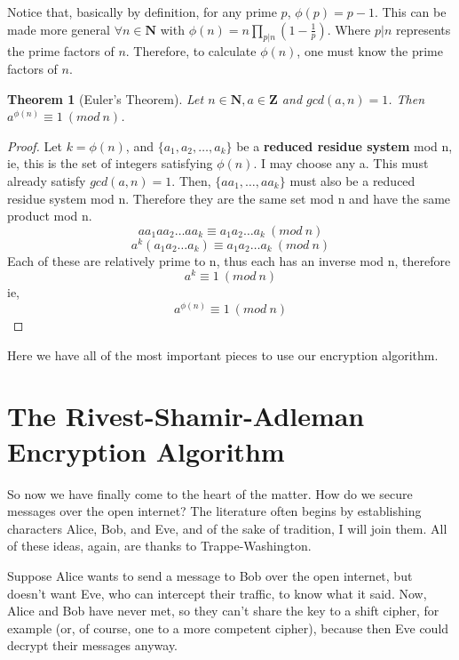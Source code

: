 \documentclass{article}
\newtheorem{thrm}{\textbf{Theorem}}
\begin{document}
                Notice that, basically by definition, for any prime $p$, $\phi(p)=p-1$.  
                This can be made more general $\forall n \in\mathbf{N}$ with  $\phi(n)=n\prod_{p|n}(1-\frac{1}{p})$.  
                Where $p|n$ represents the prime factors of $n$.
                Therefore, to calculate $\phi(n)$, one must know the prime factors of $n$. 
                
                \begin{thrm}[Euler's Theorem] Let $n\in\mathbf{N},a\in\mathbf{Z}$ and $gcd(a,n)=1$.  Then $a^{\phi(n)}\equiv 1\ (mod\ n)$.
                \end{thrm}
                
                \begin{proof}
	                Let $k=\phi(n)$, and $\{a_1,a_2,\ldots,a_k\} $ be a \textbf{reduced residue system} mod n, ie, this is the set of integers satisfying $\phi(n)$.  I may choose any a.  This must already satisfy $gcd(a,n)=1$.  Then, $\{aa_1,\ldots,aa_k\}$ must also be a reduced residue system mod n.  
	                Therefore they are the same set mod n and have the same product mod n.
	                $$ aa_1aa_2\ldots aa_k\equiv a_1a_2\ldots a_k\ (mod\ n)$$
	                $$ a^k(a_1a_2\ldots a_k)\equiv a_1a_2\ldots a_k\ (mod\ n) $$
	                Each of these are relatively prime to n, thus each has an inverse mod n, therefore
	                $$a^k \equiv 1\ (mod\ n)$$
	                ie,
	                $$a^{\phi(n)} \equiv 1\ (mod\ n)$$\cite{Ikenaga}
	            \end{proof}
	            
	        Here we have all of the most important pieces to use our encryption algorithm.
	        
	\section{The Rivest-Shamir-Adleman Encryption Algorithm}
        So now we have finally come to the heart of the matter.  How do we secure messages over the open internet?  The literature often begins by establishing characters Alice, Bob, and Eve, and of the sake of tradition, I will join them.  All of these ideas, again, are thanks to Trappe-Washington.\cite{trappewash}
     
        Suppose Alice wants to send a message to Bob over the open internet, but doesn't want Eve, who can intercept their traffic, to know what it said.  Now, Alice and Bob have never met, so they can't share the key to a shift cipher, for example (or, of course, one to a more competent cipher), because then Eve could decrypt their messages anyway.
     
\end{document}
